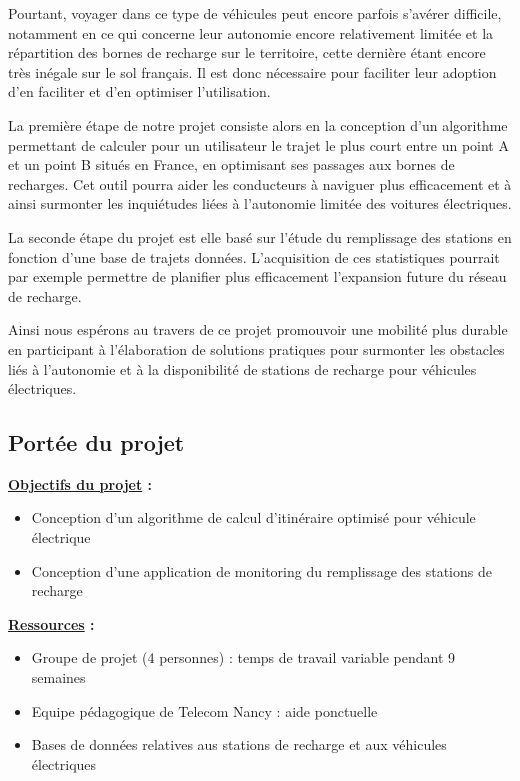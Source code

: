 \documentclass[a4paper, 12pt]{report}
\begin{document}
Pourtant, voyager dans ce type de véhicules peut encore parfois s'avérer difficile, notamment en ce qui concerne leur autonomie encore relativement limitée et la répartition des bornes de recharge sur le territoire, cette dernière étant encore très inégale sur le sol français. Il est donc nécessaire pour faciliter leur adoption d'en faciliter et d'en optimiser l'utilisation.
\bigskip

La première étape de notre projet consiste alors en la conception d'un algorithme permettant de calculer pour un utilisateur le trajet le plus court entre un point A et un point B situés en France, en optimisant ses passages aux bornes de recharges. Cet outil pourra aider les conducteurs à naviguer plus efficacement et à ainsi surmonter les inquiétudes liées à l'autonomie limitée des voitures électriques.
\bigskip

La seconde étape du projet est elle basé sur l'étude du remplissage des stations en fonction d'une base de trajets données. L'acquisition de ces statistiques pourrait par exemple permettre de planifier plus efficacement l'expansion future du réseau de recharge.
\bigskip

Ainsi nous espérons au travers de ce projet promouvoir une mobilité plus durable en participant à l'élaboration de solutions pratiques pour surmonter les obstacles liés à l'autonomie et à la disponibilité de stations de recharge pour véhicules électriques.
\bigskip

        \subsection{Portée du projet}

\textbf{\underline{Objectifs du projet} :}
\begin{itemize}
  \item Conception d'un algorithme de calcul d'itinéraire optimisé pour véhicule électrique
  \item Conception d'une application de monitoring du remplissage des stations de recharge
\end{itemize}
\bigskip

\textbf{\underline{Ressources} :}
\begin{itemize}
  \item Groupe de projet (4 personnes) : temps de travail variable pendant 9 semaines
  \item Equipe pédagogique de Telecom Nancy : aide ponctuelle
  \item Bases de données relatives aus stations de recharge et aux véhicules électriques
\end{itemize}
\clearpage
\end{document}
